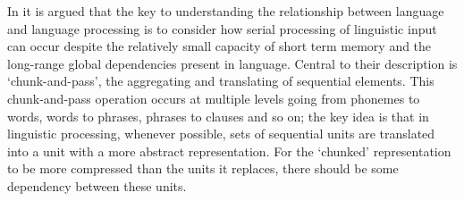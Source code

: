 \documentclass[10pt,letterpaper]{article}
\begin{document}


In \cite{ChristiansenChater2016} it is argued that the key to
understanding the relationship between language and language
processing is to consider how serial processing of linguistic input
can occur despite the relatively small capacity of short term memory
and the long-range global dependencies present in language. Central to
their description is \lq{}chunk-and-pass\rq{}, the aggregating and
translating of sequential elements. This chunk-and-pass operation
occurs at multiple levels going from phonemes to words, words to
phrases, phrases to clauses and so on; the key idea is that in
linguistic processing, whenever possible, sets of sequential units are
translated into a unit with a more abstract representation. For the
\lq{}chunked\rq{} representation to be more compressed than the units
it replaces, there should be some dependency between these
units.

%
%
%
\end{document}
